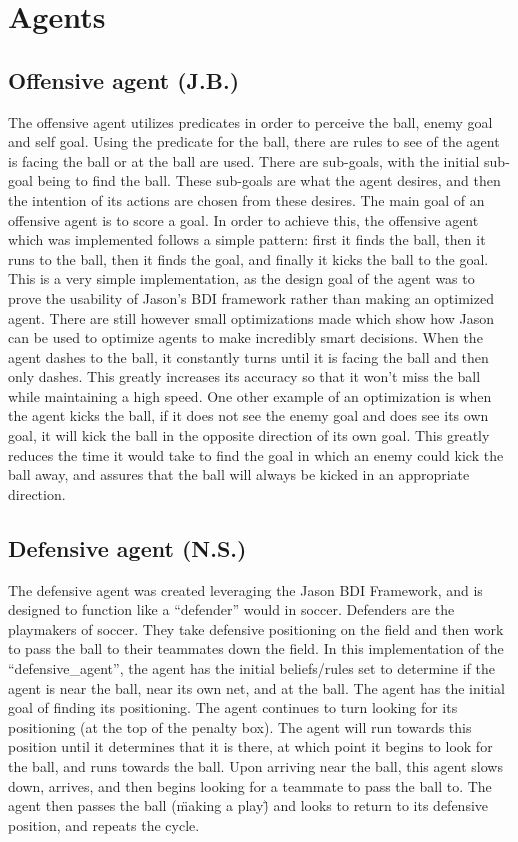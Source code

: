 \documentclass[conference]{IEEEtran}
\begin{document}
\section{Agents}

\subsection{Offensive agent (J.B.)}
The offensive agent utilizes predicates in order to perceive the ball, enemy goal and self goal.
Using the predicate for the ball, there are rules to see of the agent is facing the ball or at the ball are used.
There are sub-goals, with the initial sub-goal being to find the ball.
These sub-goals are what the agent desires, and then the intention of its actions are chosen from these desires.
The main goal of an offensive agent is to score a goal.
In order to achieve this, the offensive agent which was implemented follows a simple pattern: first it finds the ball, then it runs to the ball, then it finds the goal, and finally it kicks the ball to the goal.
This is a very simple implementation, as the design goal of the agent was to prove the usability of Jason's BDI framework rather than making an optimized agent.
There are still however small optimizations made which show how Jason can be used to optimize agents to make incredibly smart decisions.
When the agent dashes to the ball, it constantly turns until it is facing the ball and then only dashes.
This greatly increases its accuracy so that it won't miss the ball while maintaining a high speed.
One other example of an optimization is when the agent kicks the ball, if it does not see the enemy goal and does see its own goal, it will kick the ball in the opposite direction of its own goal.
This greatly reduces the time it would take to find the goal in which an enemy could kick the ball away, and assures that the ball will always be kicked in an appropriate direction.

\subsection{Defensive agent (N.S.)}
The defensive agent was created leveraging the Jason BDI Framework, and is designed to function like a ``defender'' would in soccer.
Defenders are the playmakers of soccer.
They take defensive positioning on the field and then work to pass the ball to their teammates down the field.
In this implementation of the ``defensive\_agent'', the agent has the initial beliefs/rules set to determine if the agent is near the ball, near its own net, and at the ball.
The agent has the initial goal of finding its positioning.
The agent continues to turn looking for its positioning (at the top of the penalty box).
The agent will run towards this position until it determines that it is there, at which point it begins to look for the ball, and runs towards the ball.
Upon arriving near the ball, this agent slows down, arrives, and then begins looking for a teammate to pass the ball to.
The agent then passes the ball (\"making a play\") and looks to return to its defensive position, and repeats the cycle.
\end{document}
